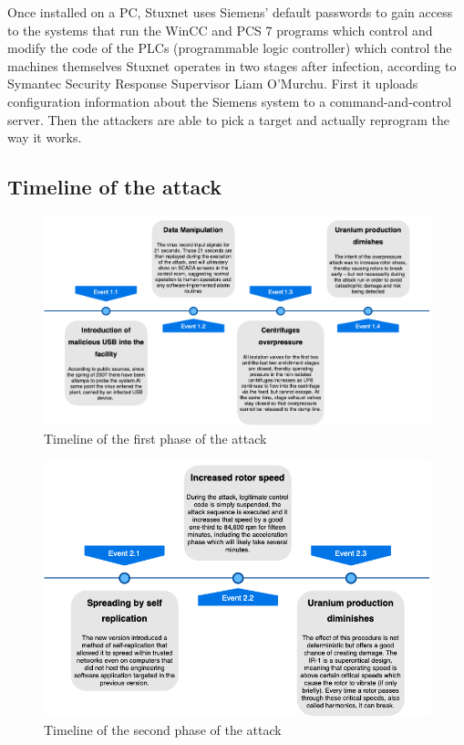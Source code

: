 \documentclass[12pt]{article}
\begin{document}
Once installed on a PC, Stuxnet uses Siemens' default passwords to gain access to the systems that run the WinCC and PCS 7 programs which control and modify the code of the PLCs (programmable logic controller) which control the machines themselves Stuxnet operates in two stages after infection, according to Symantec Security Response Supervisor Liam O'Murchu. First it uploads configuration information about the Siemens system to a command-and-control server. Then the attackers are able to pick a target and actually reprogram the way it works. 

\subsection{Timeline of the attack}
    \begin{figure}[H]
    \centering
    \includegraphics[height=0.5\textwidth]{time1.png}
    \caption{Timeline of the first phase of the attack}
    \label{fig:time1}
    \end{figure}
    
     \begin{figure}[H]
    \centering
    \includegraphics[height=0.6\textwidth]{time2.png}
    \caption{Timeline of the second phase of the attack}
    \label{fig:time2}
    \end{figure}
\end{document}

